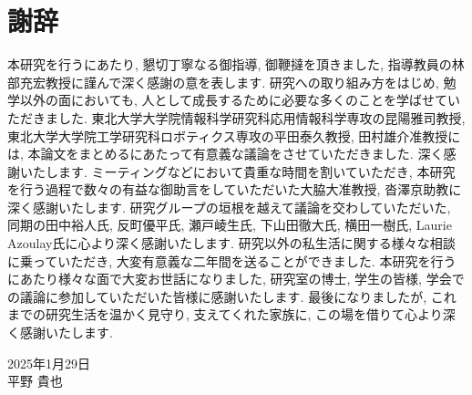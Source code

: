 \cleardoublepage %
\chapter*{謝辞}
本研究を行うにあたり, 懇切丁寧なる御指導, 御鞭撻を頂きました, 指導教員の林部充宏教授に謹んで深く感謝の意を表します.
研究への取り組み方をはじめ, 勉学以外の面においても, 人として成長するために必要な多くのことを学ばせていただきました.
東北大学大学院情報科学研究科応用情報科学専攻の昆陽雅司教授, 東北大学大学院工学研究科ロボティクス専攻の平田泰久教授, 田村雄介准教授には, 本論文をまとめるにあたって有意義な議論をさせていただきました.
深く感謝いたします.
ミーティングなどにおいて貴重な時間を割いていただき, 本研究を行う過程で数々の有益な御助言をしていただいた大脇大准教授, 沓澤京助教に深く感謝いたします.
研究グループの垣根を越えて議論を交わしていただいた, 同期の田中裕人氏, 反町優平氏, 瀬戸崚生氏, 下山田徹大氏, 横田一樹氏, Laurie Azoulay氏に心より深く感謝いたします.
研究以外の私生活に関する様々な相談に乗っていただき, 大変有意義な二年間を送ることができました.
本研究を行うにあたり様々な面で大変お世話になりました, 研究室の博士, 学生の皆様, 学会での議論に参加していただいた皆様に感謝いたします.
最後になりましたが, これまでの研究生活を温かく見守り, 支えてくれた家族に, この場を借りて心より深く感謝いたします.

\begin{flushright}
2025年1月29日\\
平野 貴也
\end{flushright}
